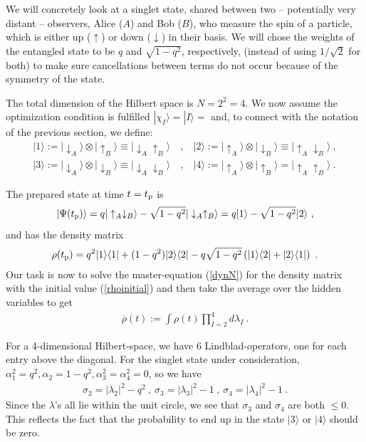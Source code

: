 \documentclass[12pt]{article}
\def\beqn{\begin{eqnarray}}
\def\eeqn{\end{eqnarray}}
\begin{document}
We will concretely look at a singlet state, shared between two -- potentially very distant -- observers, Alice ($A$) and Bob ($B$),
who measure the spin of a particle, which is either up ($\uparrow$) or down ($\downarrow$) in their basis. We will chose the weights of the entangled state to be $q$ and $\sqrt{1-q^2}$, respectively, (instead of using $1/\sqrt{2}$ for both) to make sure cancellations between terms do not occur because of the symmetry of the state.

The total dimension of the Hilbert space is $N=2^2 = 4$. We now assume the optimization condition is fulfilled $|\chi_I\rangle=|I\rangle=$ and, to connect with the notation of the previous section, we define:
\beqn
 |1 \rangle := |\downarrow_{A} \rangle \otimes |\uparrow_{B} \rangle \equiv |\downarrow_A \uparrow_B \rangle ~&,&~
 |2 \rangle := |\uparrow_{A} \rangle \otimes |\downarrow_{B} \rangle \equiv |\uparrow_A \downarrow_B \rangle ~,\nonumber \\
|3 \rangle := |\downarrow_{A} \rangle \otimes |\downarrow_{B} \rangle \equiv |\downarrow_A \downarrow_B \rangle 
~&,&~ |4 \rangle := |\uparrow_{A} \rangle \otimes |\uparrow_{B} \rangle = |\uparrow_A \uparrow_B \rangle ~.
\eeqn

The prepared state at time $t=t_{\rm p}$ is
\begin{equation}
|\Psi (t_{\rm p}) \rangle= q |\uparrow_{A}\downarrow_{B}\rangle- \sqrt{1-q^2}|\downarrow_{A}\uparrow_{B}\rangle = q |1\rangle- \sqrt{1-q^2}|2\rangle~,
\end{equation}
and has the density matrix
\beqn
\rho(t_{\rm p}) = q^2  |1\rangle \langle1| + (1-q^2)|2\rangle \langle 2| - q \sqrt{1-q^2} \left( |1\rangle \langle2| +  |2\rangle \langle1| \right) ~.  \label{rhoinitial}
\eeqn
Our task is now to solve the master-equation (\ref{dynN}) for the density matrix with the initial value (\ref{rhoinitial}) and then take the average over the hidden variables to get
\beqn\label{roqm}
\overline \rho(t) := \int \rho(t) \prod_{I=2}^4  d \lambda_I ~.
\eeqn

For a 4-dimensional Hilbert-space, we have 6 Lindblad-operators, one for each entry above the diagonal. For the singlet state under consideration, $\alpha^2_1 =q^2, \alpha_2 = 1-q^2, \alpha_3^2 = \alpha_4^2 = 0$, so we have
\beqn
\sigma_2 = |\lambda_2|^2 - q^2 ~,~ \sigma_3 = |\lambda_3|^2 -1 ~,~\sigma_4 =  |\lambda_4|^2 -1~.
\eeqn
Since the $\lambda$'s all lie within the unit circle, we see that $\sigma_3$ and $\sigma_4$ are both $\leq 0$. This reflects the fact that the probability to end up in the state $|3\rangle$ or $|4 \rangle$ should be zero. 
\end{document}
